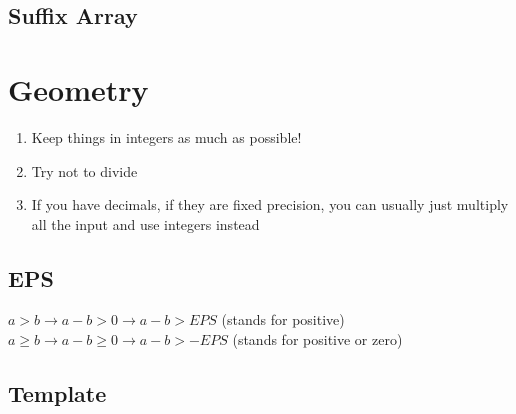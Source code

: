 \documentclass[10pt,oneside]{article}
\begin{document}
\begin{landscape}
\begin{multicols}{2}


\subsection{Suffix Array}


\section{Geometry}

\begin{enumerate}
	\item Keep things in integers as much as possible!
	\item Try not to divide
	\item If you have decimals, if they are fixed precision, you can usually just multiply all the input and use integers instead
\end{enumerate}

\subsection{EPS}

$a > b \rightarrow a - b > 0 \rightarrow a - b > EPS$ (stands for positive)\\
$a \geq b \rightarrow  a - b \geq 0 \rightarrow a - b > -EPS$ (stands for positive or zero)\\

\subsection{Template}

% 


\end{multicols}
\end{landscape}
\end{document}

